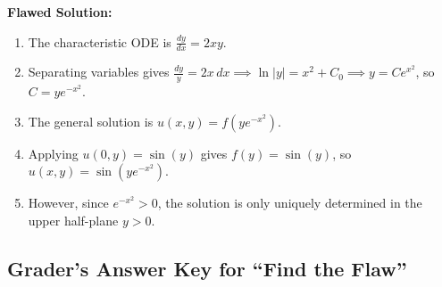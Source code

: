 \documentclass[11pt]{article}
\begin{document}
\noindent\textbf{Flawed Solution:}
\begin{enumerate}
    \item The characteristic ODE is $\frac{dy}{dx} = 2xy$.
    \item Separating variables gives $\frac{dy}{y} = 2x\,dx \implies \ln|y| = x^2 + C_0 \implies y = Ce^{x^2}$, so $C = ye^{-x^2}$.
    \item The general solution is $u(x, y) = f(ye^{-x^2})$.
    \item Applying $u(0, y) = \sin(y)$ gives $f(y) = \sin(y)$, so $u(x, y) = \sin(ye^{-x^2})$.
    \item However, since $e^{-x^2} > 0$, the solution is only uniquely determined in the upper half-plane $y > 0$.
\end{enumerate}

\hrulefill

\subsection*{Grader's Answer Key for ``Find the Flaw''}
\end{document}
